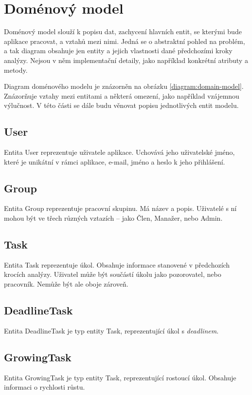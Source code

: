 \documentclass[thesis=B,czech]{FITthesis}[2012/06/26]
\begin{document}
			
			
			
			
		
		

		
	\section{Doménový model}
		\label{sec:domain-model}
		Doménový model slouží k popisu dat, zachycení hlavních entit, se kterými bude aplikace pracovat, a vztahů mezi nimi. \cite{domain-model} Jedná se o abstraktní pohled na problém, a tak diagram obsahuje jen entity a jejich vlastnosti dané předchozími kroky analýzy. Nejsou v něm implementační detaily, jako například konkrétní atributy a metody.
		
		Diagram doménového modelu je znázorněn na obrázku \ref{diagram:domain-model}. Znázorňuje vztahy mezi entitami a některá omezení, jako například vzájemnou výlučnost. \cite{domain-model-multiple-association} V této části se dále budu věnovat popisu jednotlivých entit modelu.
		
		\subsection{User}
			Entita User reprezentuje uživatele aplikace. Uchovává jeho uživatelské jméno, které je unikátní v rámci aplikace, e-mail, jméno a heslo k jeho přihlášení.
			
		\subsection{Group}
			Entita Group reprezentuje pracovní skupinu. Má název a popis. Uživatelé s ní mohou být ve třech různých vztazích -- jako Člen, Manažer, nebo Admin. 
		
		\subsection{Task}
			Entita Task reprezentuje úkol. Obsahuje informace stanovené v předchozích krocích analýzy. Uživatel může být součástí úkolu jako pozorovatel, nebo pracovník. Nemůže být ale oboje zároveň. 
		
		\subsection{DeadlineTask}
			Entita DeadlineTask je typ entity Task, reprezentující úkol s \textit{deadlinem}. 
		
		\subsection{GrowingTask}
			Entita GrowingTask je typ entity Task, reprezentující rostoucí úkol. Obsahuje informaci o rychlosti růstu.
		
\end{document}
